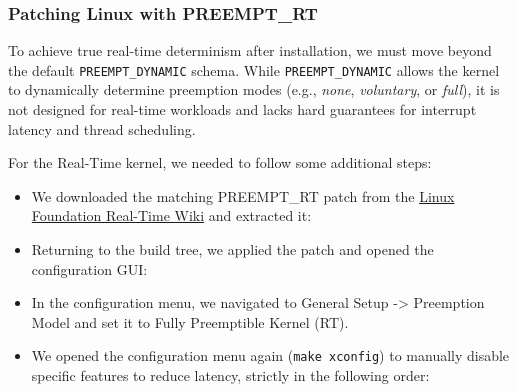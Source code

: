 \subsubsection{Patching Linux with
PREEMPT\_RT}\label{patching-linux-with-preempt_rt}

To achieve true real-time determinism after installation, we must move
beyond the default \texttt{PREEMPT\_DYNAMIC} schema. While
\texttt{PREEMPT\_DYNAMIC} allows the kernel to dynamically determine
preemption modes (e.g., \emph{none}, \emph{voluntary}, or \emph{full}),
it is not designed for real-time workloads and lacks hard guarantees for
interrupt latency and thread scheduling.

For the Real-Time kernel, we needed to follow some additional steps:

\begin{itemize}
\item
  We downloaded the matching PREEMPT\_RT patch from the
  \href{https://wiki.linuxfoundation.org/realtime/start}{Linux
  Foundation Real-Time Wiki} and extracted it:

\begin{Shaded}
\begin{Highlighting}[]
\OperatorTok{\textgreater{}}
\end{Highlighting}
\end{Shaded}
\item
  Returning to the build tree, we applied the patch and opened the
  configuration GUI:

\begin{Shaded}
\begin{Highlighting}[]
\OperatorTok{\textless{}}
\end{Highlighting}
\end{Shaded}
\item
  In the configuration menu, we navigated to General Setup
  -\textgreater{} Preemption Model and set it to Fully Preemptible
  Kernel (RT).
\item
  We opened the configuration menu again (\texttt{make\ xconfig}) to
  manually disable specific features to reduce latency, strictly in the
  following order:


\end{itemize}
